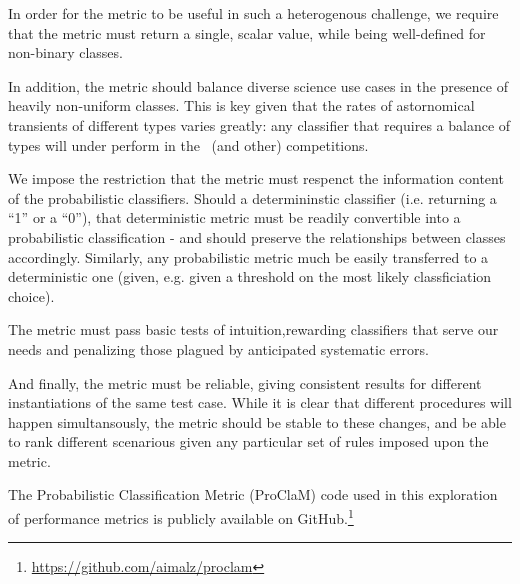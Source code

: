 
In order for the metric to be useful in such a heterogenous challenge, we require that the metric must return a single, scalar value, while being well-defined for non-binary classes.

In addition, the metric should balance diverse science use cases in the presence of heavily non-uniform classes.
This is key given that the rates of astornomical transients of different types varies greatly: any classifier that requires a balance of types will under perform in the \plasticc\ (and other) competitions.

We impose the restriction that the metric must respenct the information content of the probabilistic classifiers.
Should a determininstic classifier (i.e. returning a ``1'' or a ``0''), that deterministic metric must be readily convertible into a probabilistic classification - and should preserve the relationships between classes accordingly.
Similarly, any probabilistic metric much be easily transferred to a deterministic one (given, e.g. given a threshold on the most likely classficiation choice).

The metric must pass basic tests of intuition,rewarding classifiers that serve our needs and penalizing those plagued by anticipated systematic errors.

And finally, the metric must be reliable, giving consistent results for different instantiations of the same test case.
While it is clear that different procedures will happen simultansously, the metric should be stable to these changes, and be able to rank different scenarious given any particular set of rules imposed upon the metric.

The Probabilistic Classification Metric (ProClaM) code used in this exploration of performance metrics is publicly available on GitHub.\footnote{\url{https://github.com/aimalz/proclam}}
